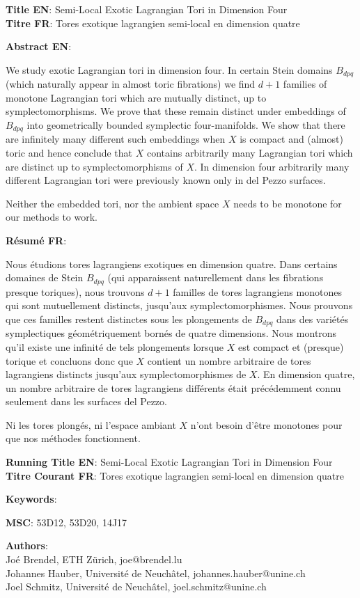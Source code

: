\documentclass{minimal}
\begin{document}
\textbf{Title EN}: Semi-Local Exotic Lagrangian Tori in Dimension Four\\
\textbf{Titre FR}: Tores exotique lagrangien semi-local en dimension quatre

\textbf{Abstract EN}:
      \begin{center}
We study exotic Lagrangian tori in dimension four.
In certain Stein domains $B_{dpq}$ (which naturally appear in almost toric fibrations) we find $d+1$ families of monotone Lagrangian tori which are mutually distinct, up to symplectomorphisms.
We prove that these remain distinct under embeddings of $B_{dpq}$ into geometrically bounded symplectic four-manifolds.
We show that there are infinitely many different such embeddings when $X$ is compact and (almost) toric and hence conclude that $X$ contains arbitrarily many Lagrangian tori which are distinct up to symplectomorphisms of $X$.
In dimension four arbitrarily many different Lagrangian tori were previously known
only in del Pezzo surfaces.

Neither the embedded tori, nor the ambient space $X$ needs to be monotone for our methods to work. 
      \end{center}
      \textbf{Résumé FR}:
      \begin{center}
Nous étudions tores lagrangiens exotiques en dimension quatre.
Dans certains domaines de Stein $B_{dpq}$ (qui apparaissent naturellement dans les fibrations presque toriques), nous trouvons $d+1$ familles de tores lagrangiens monotones qui sont mutuellement distincts, jusqu'aux symplectomorphismes.
Nous prouvons que ces familles restent distinctes sous les plongements de $B_{dpq}$ dans des variétés symplectiques géométriquement bornés de quatre dimensions.
Nous montrons qu'il existe une infinité de tels plongements lorsque $X$ est compact et (presque) torique et concluons donc que $X$ contient un nombre arbitraire de tores lagrangiens distincts jusqu'aux symplectomorphismes de $X$.
En dimension quatre, un nombre arbitraire de tores lagrangiens différents était précédemment connu
seulement dans les surfaces del Pezzo.

Ni les tores plongés, ni l'espace ambiant $X$ n'ont besoin d'être monotones pour que nos méthodes fonctionnent. 
      \end{center}

\textbf{Running Title EN}: Semi-Local Exotic Lagrangian Tori in Dimension Four\\
\textbf{Titre Courant FR}: Tores exotique lagrangien semi-local en dimension quatre

\textbf{Keywords}: 

\textbf{MSC}: 53D12, 53D20, 14J17

\textbf{Authors}:\\
Joé Brendel, ETH Zürich, joe@brendel.lu\\
Johannes Hauber, Université de Neuchâtel, johannes.hauber@unine.ch\\
Joel Schmitz, Université de Neuchâtel, joel.schmitz@unine.ch
\end{document}
